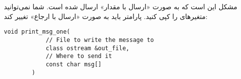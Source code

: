 \section{}
\paragraph{}\label{answer:40}
مشکل این است که  به صورت «ارسال با مقدار» ارسال شده است. شما نمی‌توانید متغیرهای  را کپی کنید. پارامتر باید به صورت «ارسال با ارجاع» تغییر کند:
\begin{LTR}
    \begin{lstlisting}[style=C++Style]
        void print_msg_one(
            // File to write the message to
            class ostream &out_file,
            // Where to send it
            const char msg[]
        )
    \end{lstlisting}
\end{LTR}

